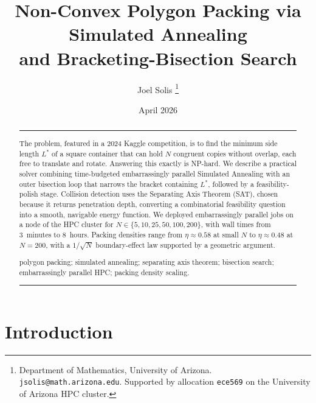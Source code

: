 \documentclass[10pt]{article}
\title{%
  \Large\bfseries
  Non-Convex Polygon Packing via Simulated Annealing\\[4pt]
  and Bracketing-Bisection Search%
}
\author{%
  Joel Solis%
  \thanks{Department of Mathematics, University of Arizona.
    \texttt{jsolis@math.arizona.edu}.
    Supported by allocation \texttt{ece569} on the
    University of Arizona HPC cluster.}%
}
\date{April 2026}
\begin{document}
\maketitle
\thispagestyle{firstpage}

\begin{abstract}
\vspace{-2pt}
\noindent\rule{\linewidth}{0.4pt}\vspace{4pt}

\enspace\small
The problem, featured in a 2024
Kaggle competition, is to find the minimum side length $L^*$ of a
square container that can hold $N$ congruent copies without overlap,
each free to translate and rotate. Answering this exactly is NP-hard.
We describe a practical solver combining time-budgeted embarrassingly parallel
 Simulated
Annealing with an outer bisection loop that narrows the bracket
containing $L^*$, followed by a
feasibility-polish stage. Collision detection uses the Separating Axis
Theorem (SAT), chosen because it returns penetration depth, converting
a combinatorial feasibility question into a smooth, navigable energy
function. We deployed embarrassingly parallel jobs on a node of the
HPC cluster for $N \in \{5, 10, 25, 50, 100, 200\}$, with wall times
from 3~minutes to 8~hours. Packing densities range from
$\eta \approx 0.58$ at small $N$ to $\eta \approx 0.48$ at $N = 200$,
with a $1/\!\sqrt{N}$ boundary-effect law supported by a geometric
argument.

\vspace{5pt}
\enspace\small
polygon packing; simulated annealing; separating axis theorem;
bisection search; embarrassingly parallel HPC; packing density scaling.

\vspace{4pt}
\noindent\rule{\linewidth}{0.4pt}\vspace{2pt}
\end{abstract}

\section{Introduction}
\label{sec:intro}
\end{document}
